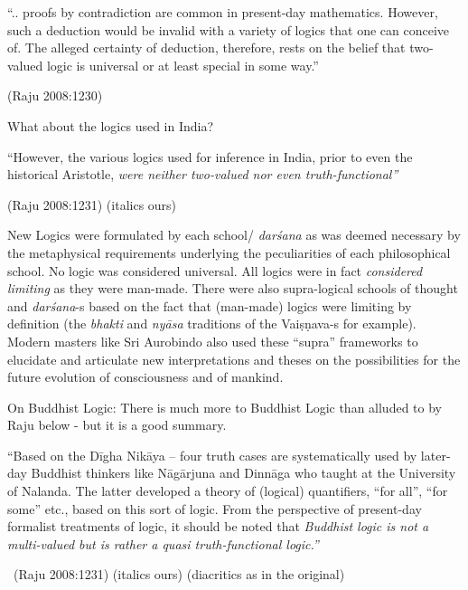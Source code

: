 \begin{myquote}
“.. proofs by contradiction are common in present-day mathematics. However, such a deduction would be invalid with a variety of logics that one can conceive of. The alleged certainty of deduction, therefore, rests on the belief that two-valued logic is universal or at least special in some way.”
\end{myquote}

\hfill (Raju 2008:1230)

What about the logics used in India?

\begin{myquote}
“However, the various logics used for inference in India, prior to even the historical Aristotle, \textit{were neither two-valued nor even\general{\break } truth-functional”}
\end{myquote}

\hfill (Raju 2008:1231) (italics ours)

New Logics were formulated by each school/ \textit{darśana} as was deemed necessary by the metaphysical requirements underlying the peculiarities of each philosophical school. No logic was considered universal. All logics were in fact \textit{considered limiting} as they were man-made. There were also supra-logical schools of thought and \textit{darśana}-s based on the fact that (man-made) logics were limiting by definition (the \textit{bhakti} and \textit{nyāsa} traditions of the Vaiṣṇava-s for example). Modern masters like Sri Aurobindo also used these “supra” frameworks to elucidate and articulate new interpretations and theses on the possibilities for the future evolution of consciousness and of mankind.

On Buddhist Logic:  There is much more to Buddhist Logic than alluded to by Raju below - but it is a good summary.

\begin{myquote}
“Based on the Dīgha Nikāya – four truth cases are systematically used by later-day Buddhist thinkers like Nāgārjuna and Dinnāga who taught at the University of Nalanda. The latter developed a theory of (logical) quantifiers, “for all”, “for some” etc., based on this sort of logic. From the perspective of present-day formalist treatments of logic, it should be noted that \textit{Buddhist logic is not a multi-valued but is rather a quasi truth-functional logic.”}

~\hfill (Raju 2008:1231) (italics ours) (diacritics as in the original)
\end{myquote}

